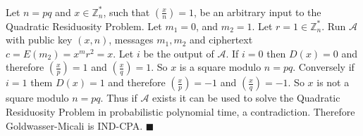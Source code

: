\documentclass[letterpaper,12pt,oneside,onecolumn]{report}
\begin{document}
\paragraph{}
Let $n = pq$ and $x \in \mathbb{Z}_n^*$, such that $\left(\frac{x}{n}\right) = 1$, be an arbitrary input to the Quadratic Residuosity Problem. Let $m_1 = 0$, and $m_2 = 1$. Let $r = 1 \in \mathbb{Z}_n^*$. Run $\mathcal{A}$ with public key $(x,n)$, messages $m_1, m_2$ and ciphertext $c = E(m_2) = x^mr^2 = x$. Let $i$ be the output of $\mathcal{A}$. If $i = 0$ then $D(x) = 0$ and therefore $\left(\frac{x}{p}\right) = 1$ and $\left(\frac{x}{q}\right) = 1$. So $x$ is a square modulo $n=pq$. Conversely if $i=1$ them $D(x) = 1$ and therefore $\left(\frac{x}{p}\right) = -1$ and $\left(\frac{x}{q}\right) = -1$. So $x$ is not a square modulo $n=pq$. Thus if $\mathcal{A}$ exists it can be used to solve the Quadratic Residuosity Problem in probabilistic polynomial time, a contradiction. Therefore Goldwasser-Micali is IND-CPA. $\blacksquare$
\end{document}
